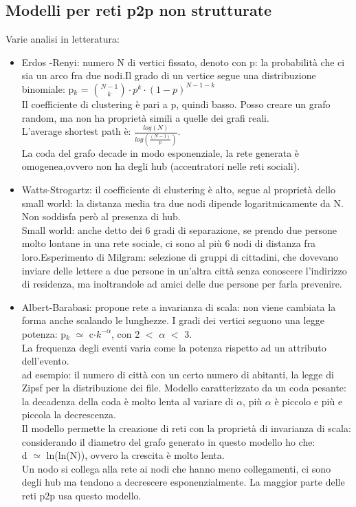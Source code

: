 \documentclass{article}
\begin{document}
\subsection{Modelli per reti p2p non strutturate}
Varie analisi in letteratura:
\begin{itemize}
\item Erdos -Renyi: numero N di vertici fissato, denoto con p: la probabilità che ci sia un arco fra due nodi.Il grado di un vertice segue una distribuzione binomiale: p$_{k}$ = $\binom{N-1}{k}\cdot p^{k}\cdot(1-p)^{N-1-k}$\\ Il coefficiente di clustering è pari a p, quindi basso. Posso creare un grafo random, ma non ha proprietà simili a quelle dei grafi reali.\\ L'average shortest path è: $\frac{log(N)}{log(\frac{(N-1)}{p})}$.\\ La coda del grafo decade in modo esponenziale, la rete generata è omogenea,ovvero non ha degli hub (accentratori nelle reti sociali).
\item Watts-Strogartz: il coefficiente di clustering è alto, segue al proprietà dello small world: la distanza media tra due nodi dipende logaritmicamente da N.\\ Non soddisfa però al presenza di hub.\\ Small world: anche detto dei 6 gradi di separazione, se prendo due persone molto lontane in una rete sociale, ci sono al più 6 nodi di distanza fra loro.Esperimento di Milgram: selezione di gruppi di cittadini, che dovevano inviare delle lettere a due persone in un'altra città senza conoscere l'indirizzo di residenza, ma inoltrandole ad amici
delle due persone per farla prevenire.
\item Albert-Barabasi: propone rete a invarianza di scala: non viene cambiata la forma anche scalando le lunghezze. I gradi dei vertici seguono una legge potenza: p$_{k}$ $\simeq$ c$\cdot k^{-\alpha}$, con 2 $<$ $\alpha$ $<$ 3.\\ La frequenza degli eventi varia come la potenza rispetto ad un attributo dell'evento.\\ ad esempio: il numero di città con un certo numero di abitanti, la legge di Zipsf per la distribuzione dei file. Modello caratterizzato da un coda pesante: la decadenza della coda è molto lenta al variare di $\alpha$, più $\alpha$ è piccolo e più e piccola la decrescenza.\\ Il modello permette la creazione di reti con la proprietà di invarianza di scala: considerando il diametro del grafo generato in questo modello ho che:\\
d $\simeq$ ln(ln(N)), ovvero la crescita è molto lenta.\\ Un nodo si collega alla rete ai nodi che hanno meno collegamenti, ci sono degli hub ma tendono a decrescere esponenzialmente. La maggior parte delle reti p2p usa questo modello.
\end{itemize}
\end{document}

